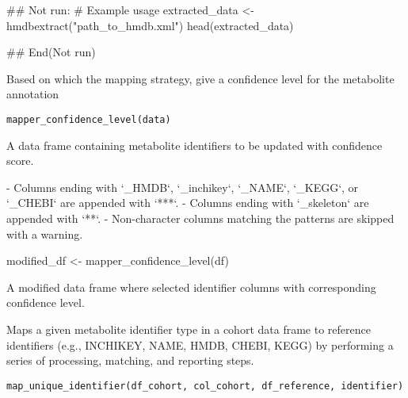 \documentclass[a4paper]{book}
\begin{document}
%
\begin{Examples}
\begin{ExampleCode}
## Not run: 
  # Example usage
  extracted_data <- hmdbextract("path_to_hmdb.xml")
  head(extracted_data)

## End(Not run)

\end{ExampleCode}
\end{Examples}
%
\begin{Description}
Based on which the mapping strategy, give a confidence level for the metabolite annotation
\end{Description}
%
\begin{Usage}
\begin{verbatim}
mapper_confidence_level(data)
\end{verbatim}
\end{Usage}
%
\begin{Arguments}
\begin{ldescription}
\item[\code{data}] A data frame containing metabolite identifiers to be updated with confidence score.
\end{ldescription}
\end{Arguments}
%
\begin{Details}
- Columns ending with `\_HMDB`, `\_inchikey`, `\_NAME`, `\_KEGG`, or `\_CHEBI` are appended with `***`.
- Columns ending with `\_skeleton` are appended with `**`.
- Non-character columns matching the patterns are skipped with a warning.

modified\_df <- mapper\_confidence\_level(df)
\end{Details}
%
\begin{Value}
A modified data frame where selected identifier columns with corresponding confidence level.
\end{Value}
%
\begin{Description}
Maps a given metabolite identifier type in a cohort data frame to reference identifiers
(e.g., INCHIKEY, NAME, HMDB, CHEBI, KEGG) by performing a series of processing, matching,
and reporting steps.
\end{Description}
%
\begin{Usage}
\begin{verbatim}
map_unique_identifier(df_cohort, col_cohort, df_reference, identifier)
\end{verbatim}
\end{Usage}
\end{document}
